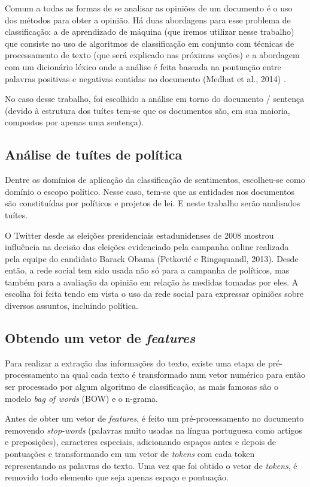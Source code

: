 Comum a todas as formas de se analisar as opiniões de um documento é o uso dos métodos
para obter a opinião. Há duas abordagens para esse problema de classificação: a de aprendizado
de máquina (que iremos utilizar nesse trabalho) que consiste no uso de algoritmos de 
classificação em conjunto com técnicas de processamento de texto (que será explicado nas próximas
seções) e a abordagem com um dicionário léxico onde a análise é feita baseada na pontuação
entre palavras positivas e negativas contidas no documento (Medhat et al., 2014) \citep{medhat2014}.

No caso desse trabalho, foi escolhido a análise em torno do documento / sentença (devido à estrutura
dos tuítes tem-se que os documentos são, em sua maioria, compostos por apenas uma 
sentença). 

\subsection{Análise de tuítes de política}

Dentre os domínios de aplicação da classificação de sentimentos, escolheu-se como domínio o
escopo político. Nesse caso, tem-se que as entidades nos documentos são constituídas por
políticos e projetos de lei. E neste trabalho serão analisados tuítes.

O Twitter desde as eleições presidenciais estadunidenses de 2008 mostrou influência
na decisão das eleições evidenciado pela campanha online realizada pela equipe do
candidato Barack Obama (Petković e Ringsquandl, 2013)\citep{petkovic2013}. Desde então, 
a rede social tem sido usada não só para a campanha de políticos, mas também para a avaliação
da opinião em relação às medidas tomadas por eles. 
A escolha foi feita tendo em vista o uso da rede social 
para expressar opiniões sobre diversos assuntos, incluindo política.


\subsection{Obtendo um vetor de \textit{features}}
\label{subsec:featurization}

Para realizar a extração das informações do texto, existe uma etapa de pré-processamento na qual
cada texto é transformado num vetor numérico para então ser processado por algum algoritmo de
classificação, as mais famosas são o modelo \textit{bag of words} (BOW) e o n-grama. 


Antes de obter um vetor de \textit{features}, é feito um pré-processamento no documento removendo 
\textit{stop-words} (palavras muito usadas na língua portuguesa como artigos e preposições), caracteres 
especiais, adicionando espaços antes e depois  de pontuações e transformando
em um vetor de \textit{tokens} com cada token representando as palavras do texto. 
Uma vez que foi obtido o vetor de \textit{tokens}, é removido todo 
elemento que seja apenas espaço e pontuação.

